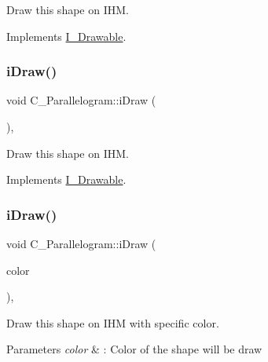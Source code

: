 Draw this shape on I\+HM. 



Implements \hyperlink{classI__Drawable_ae24c65000977a805f52ce032321cd86f}{I\+\_\+\+Drawable}.

\mbox{\label{classC__Parallelogram_a6d43cc787a39def68c7b7de4a33caf5e}} 
\subsubsection{\texorpdfstring{i\+Draw()}{iDraw()}\hspace{0.1cm}{\footnotesize\ttfamily [2/4]}}
{\footnotesize\ttfamily void C\+\_\+\+Parallelogram\+::i\+Draw (\begin{DoxyParamCaption}{ }\end{DoxyParamCaption})\hspace{0.3cm}{\ttfamily [override]}, {\ttfamily [virtual]}}



Draw this shape on I\+HM. 



Implements \hyperlink{classI__Drawable_ae24c65000977a805f52ce032321cd86f}{I\+\_\+\+Drawable}.

\mbox{\label{classC__Parallelogram_a044ce6d1042ea93589a38f4686489862}} 
\subsubsection{\texorpdfstring{i\+Draw()}{iDraw()}\hspace{0.1cm}{\footnotesize\ttfamily [3/4]}}
{\footnotesize\ttfamily void C\+\_\+\+Parallelogram\+::i\+Draw (\begin{DoxyParamCaption}\item[{M\+L\+V\+\_\+\+Color}]{color }\end{DoxyParamCaption})\hspace{0.3cm}{\ttfamily [override]}, {\ttfamily [virtual]}}



Draw this shape on I\+HM with specific color. 


\begin{DoxyParams}{Parameters}
{\em color} & \+: Color of the shape will be draw \\
\hline
\end{DoxyParams}


